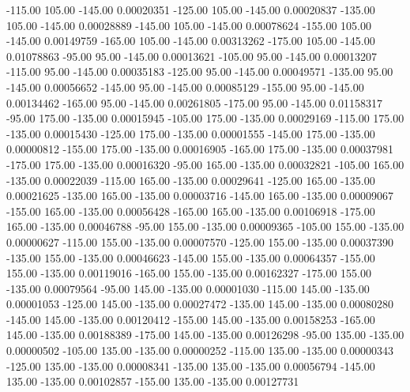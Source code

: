    -115.00    105.00   -145.00     0.00020351
   -125.00    105.00   -145.00     0.00020837
   -135.00    105.00   -145.00     0.00028889
   -145.00    105.00   -145.00     0.00078624
   -155.00    105.00   -145.00     0.00149759
   -165.00    105.00   -145.00     0.00313262
   -175.00    105.00   -145.00     0.01078863
    -95.00     95.00   -145.00     0.00013621
   -105.00     95.00   -145.00     0.00013207
   -115.00     95.00   -145.00     0.00035183
   -125.00     95.00   -145.00     0.00049571
   -135.00     95.00   -145.00     0.00056652
   -145.00     95.00   -145.00     0.00085129
   -155.00     95.00   -145.00     0.00134462
   -165.00     95.00   -145.00     0.00261805
   -175.00     95.00   -145.00     0.01158317
    -95.00    175.00   -135.00     0.00015945
   -105.00    175.00   -135.00     0.00029169
   -115.00    175.00   -135.00     0.00015430
   -125.00    175.00   -135.00     0.00001555
   -145.00    175.00   -135.00     0.00000812
   -155.00    175.00   -135.00     0.00016905
   -165.00    175.00   -135.00     0.00037981
   -175.00    175.00   -135.00     0.00016320
    -95.00    165.00   -135.00     0.00032821
   -105.00    165.00   -135.00     0.00022039
   -115.00    165.00   -135.00     0.00029641
   -125.00    165.00   -135.00     0.00021625
   -135.00    165.00   -135.00     0.00003716
   -145.00    165.00   -135.00     0.00009067
   -155.00    165.00   -135.00     0.00056428
   -165.00    165.00   -135.00     0.00106918
   -175.00    165.00   -135.00     0.00046788
    -95.00    155.00   -135.00     0.00009365
   -105.00    155.00   -135.00     0.00000627
   -115.00    155.00   -135.00     0.00007570
   -125.00    155.00   -135.00     0.00037390
   -135.00    155.00   -135.00     0.00046623
   -145.00    155.00   -135.00     0.00064357
   -155.00    155.00   -135.00     0.00119016
   -165.00    155.00   -135.00     0.00162327
   -175.00    155.00   -135.00     0.00079564
    -95.00    145.00   -135.00     0.00001030
   -115.00    145.00   -135.00     0.00001053
   -125.00    145.00   -135.00     0.00027472
   -135.00    145.00   -135.00     0.00080280
   -145.00    145.00   -135.00     0.00120412
   -155.00    145.00   -135.00     0.00158253
   -165.00    145.00   -135.00     0.00188389
   -175.00    145.00   -135.00     0.00126298
    -95.00    135.00   -135.00     0.00000502
   -105.00    135.00   -135.00     0.00000252
   -115.00    135.00   -135.00     0.00000343
   -125.00    135.00   -135.00     0.00008341
   -135.00    135.00   -135.00     0.00056794
   -145.00    135.00   -135.00     0.00102857
   -155.00    135.00   -135.00     0.00127731
